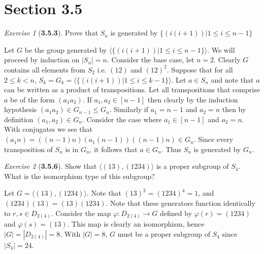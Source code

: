 \documentclass[12pt]{amsart}
\makeatletter
\theoremstyle{remark}
\newtheorem*{exercise}{Exercise}%
\renewenvironment{proof}[1][\proofname]{\par\doublespacing
  \pushQED{\qed}%
  \normalfont \topsep6\p@\@plus6\p@\relax
  \list{}{%
    \settowidth{\leftmargin}{\itshape\proofname:\hskip\labelsep}%
    \setlength{\labelwidth}{0pt}%
    \setlength{\itemindent}{-\leftmargin}%
  }%
  \item[\hskip\labelsep\itshape#1\@addpunct{:}]\ignorespaces
}{%
  \popQED\endlist\@endpefalse
  \singlespacing
}
\theoremstyle{mycomment}
\makeatother
\begin{document}
\section*{\textbf{Section 3.5}}



\begin{exercise}[\textbf{3.5.3}] Prove that $S_n$ is generated by $\{(i (i+1))| 1 \leq i \leq n - 1\}$ 
  \begin{proof} Let $G$ be the group generated by $\langle\{(i (i+1))| 1 \leq i \leq n - 1\}\rangle$. We will proceed by induction on $|S_n| = n$. Consider the base case, let $n = 2$. Clearly $G$ contains all elements from $S_2$ i.e. $(1 2)$ and $(1 2)^2$. Suppose that for all $2 \leq k < n$, $S_k = G_k = \langle\{(i (i+1))| 1 \leq i \leq k - 1\}\rangle$. Let $a \in S_n$ and note that $a$ can be written as a product of transpositions. Let all transpositions that comprise $a$ be of the form $(a_1 a_2)$. If $a_1, a_2 \in [n - 1]$ then clearly by the induction hypothesis $(a_1 a_2) \in G_{n - 1} \leq G_n$. Similarly if $a_1 = n - 1$ and $a_2 = n$ then by definition $(a_1, a_2) \in G_n$. Consider the case where $a_1 \in [n - 1]$ and $a_2 = n$. With conjugates we see that $(a_1 n) = ((n - 1) n)(a_1 (n - 1))((n - 1) n) \in G_n$. Since every transposition of $S_n$ is in $G_n$, it follows that $a \in G_n$. 
  Thus $S_n$ is generated by $G_n$. 
    \end{proof}
\end{exercise}
\vspace{.15in}


\begin{exercise}[\textbf{3.5.6}] Show that $\langle (1 3), (1 2 3 4) \rangle$ is a proper subgroup of $S_4$. What is the isomorphism type of this subgroup?
  \begin{proof} Let $G = \langle (1 3), (1 2 3 4) \rangle$. Note that $(1 3)^2 = (1 2 3 4)^4 = 1$, and $(1 2 3 4)(1 3) = (1 3)(1 2 3 4)$. Note that these generators function identically to $r, s \in D_{2(4)}$. Consider the map $\varphi: D_{2(4)} \to G$ defined by $\varphi(r) = (1 2 3 4)$ and $\varphi(s) = (1 3)$. This map is clearly an isomorphism, hence $|G| = |D_{2(4)}| = 8$. With $|G| = 8$, $G$ must be a proper subgroup of $S_4$ since $|S_4| = 24$. 
    \end{proof}
\end{exercise}
\vspace{.15in}
\end{document}
